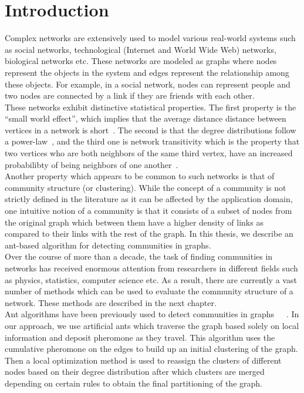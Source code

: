 \chapter{Introduction}
\begin{spacing}{1.5}
\thispagestyle{empty}
Complex networks are extensively used to model various real-world systems such as social networks, technological (Internet and World Wide Web) networks, biological networks etc. These networks are modeled as graphs where nodes represent the objects in the system and edges represent the relationship among these objects. For example, in a social network, nodes can represent people and two nodes are connected by a link if they are friends with each other. \\
\indent These networks exhibit distinctive statistical properties. The first property is the ``small world effect'', which implies that the average distance distance between vertices in a network is short~\cite{milgram67smallworld}. The second is that the degree distributions follow a power-law~\cite{Barabasi99emergenceScaling}, and the third one is network transitivity which is the property that two vertices who are both neighbors of the same third vertex, have an increased probabilibty of being neighbors of one another~\cite{Watts-Colective-1998}.\\
\indent Another property which appears to be common to such networks is that of community structure (or clustering). While the concept of a community is not strictly defined in the literature as it can be affected by the application domain, one intuitive notion of a community is that it consists of a subset of nodes from the original graph which between them have a higher density of links as compared to their links with the rest of the graph. In this thesis, we describe an ant-based algorithm for detecting communities in graphs.\\
\indent Over the course of more than a decade, the task of finding communities in networks has received enormous attention from researchers in different fields such as physics, statistics, computer science etc. As a result, there are currently a vast number of methods which can be used to evaluate the community structure of a network. These methods are described in the next chapter.\\
\indent Ant algorithms have been previously used to detect communities in graphs~\cite{DBLP:journals/corr/abs-1303-4711}~\cite{5586496}~\cite{Jin:2011:ACO:2022850.2022861}. In our approach, we use artificial ants which traverse the graph based solely on local information and deposit pheromone as they travel. This algorithm uses the cumulative pheromone on the edges to build up an initial clustering of the graph. Then a local optimization method is used to reassign the clusters of different nodes based on their degree distribution after which clusters are merged depending on certain rules to obtain the final partitioning of the graph.\\

\end{spacing}
